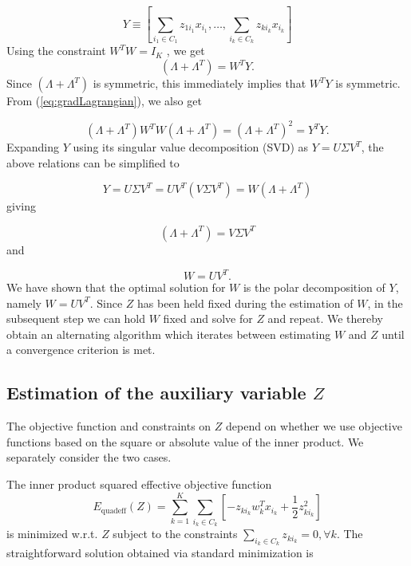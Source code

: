 \begin{equation}
Y\equiv\left[\sum_{i_{1}\in C_{1}}z_{1i_{1}}x_{i_{1}},\ldots,\sum_{i_{k}\in C_{k}}z_{ki_{k}}x_{i_{k}}\right]\label{eq:Ydef}
\end{equation}
Using the constraint $W^{T}W=I_{K}$ , we get 
\begin{equation}
\left(\Lambda+\Lambda^{T}\right)=W^{T}Y.\label{eq:lambdasol}
\end{equation}
Since $\left(\Lambda+\Lambda^{T}\right)$ is symmetric, this immediately
implies that $W^{T}Y$ is symmetric. From (\ref{eq:gradLagrangian}),
we also get 

\begin{equation}
\left(\Lambda+\Lambda^{T}\right)W^{T}W\left(\Lambda+\Lambda^{T}\right)=\left(\Lambda+\Lambda^{T}\right)^{2}=Y^{T}Y.\label{eq:lambdasol2}
\end{equation}
Expanding $Y$ using its singular value decomposition (SVD) as $Y=U\Sigma V^{T}$,
the above relations can be simplified to 

\begin{equation}
Y=U\Sigma V^{T}=UV^{T}(V\Sigma V^{T})=W\left(\Lambda+\Lambda^{T}\right)\label{eq:Wsoltmp}
\end{equation}
giving 

\begin{equation}
\left(\Lambda+\Lambda^{T}\right)=V\Sigma V^{T}\label{eq:lambdasolfinal}
\end{equation}
and 

\begin{equation}
W=UV^{T}.\label{eq:Wsolfinal}
\end{equation}
We have shown that the optimal solution for $W$ is the polar decomposition
of $Y$, namely $W=UV^{T}$. Since $Z$ has been held fixed during
the estimation of $W$, in the subsequent step we can hold $W$ fixed
and solve for $Z$ and repeat. We thereby obtain an alternating algorithm
which iterates between estimating $W$ and $Z$ until a convergence
criterion is met. 

\subsection{Estimation of the auxiliary variable $Z$}

The objective function and constraints on $Z$ depend on whether we
use objective functions based on the square or absolute value of the
inner product. We separately consider the two cases.

The inner product squared effective objective function 
\begin{equation}
E_{\mathrm{quadeff}}(Z)=\sum_{k=1}^{K}\sum_{i_{k}\in C_{k}}\left[-z_{ki_{k}}w_{k}^{T}x_{i_{k}}+\frac{1}{2}z_{ki_{k}}^{2}\right]\label{eq:Equadeff}
\end{equation}
is minimized w.r.t. $Z$ subject to the constraints $\sum_{i_{k}\in C_{k}}z_{ki_{k}}=0,\forall k$.
The straightforward solution obtained via standard minimization is 

